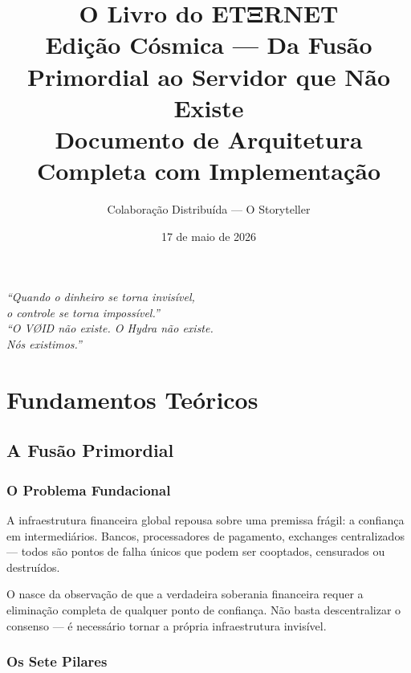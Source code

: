 \documentclass[12pt,a4paper,twoside]{book}
\title{{\Huge \textbf{O Livro do ETΞRNET}}\\[1cm]
{\Large Edição Cósmica — Da Fusão Primordial ao Servidor que Não Existe}\\[0.5cm]
{\normalsize Documento de Arquitetura Completa com Implementação}}
\author{Colaboração Distribuída — O Storyteller}
\date{17 de maio de 2026}
\theoremstyle{remark}
\newcommand{\ET}{\text{ETΞRNET}}
\begin{document}
\maketitle

\thispagestyle{empty}
\vspace*{5cm}
\begin{flushright}
\textit{``Quando o dinheiro se torna invisível,}\\
\textit{o controle se torna impossível.''}\\[1cm]
\textit{``O VØID não existe. O Hydra não existe.}\\
\textit{Nós existimos.''}
\end{flushright}

\newpage

\tableofcontents

\part{Fundamentos Teóricos}

\chapter{A Fusão Primordial}
\label{chap:fusao}

\section{O Problema Fundacional}

A infraestrutura financeira global repousa sobre uma premissa frágil: a confiança em intermediários. Bancos, processadores de pagamento, exchanges centralizados — todos são pontos de falha únicos que podem ser cooptados, censurados ou destruídos.

O \ET{} nasce da observação de que a verdadeira soberania financeira requer a eliminação completa de qualquer ponto de confiança. Não basta descentralizar o consenso — é necessário tornar a própria infraestrutura invisível.

\section{Os Sete Pilares}
\end{document}
